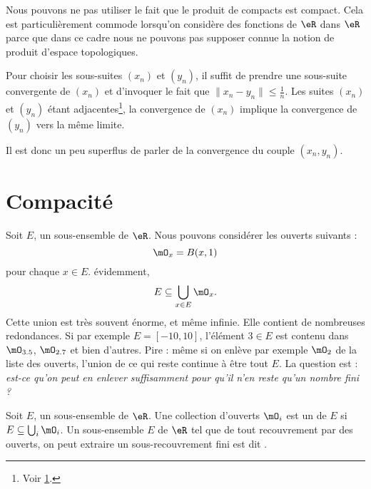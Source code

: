 \begin{remark}
    Nous pouvons ne pas utiliser le fait que le produit de compacts est compact. Cela est particulièrement commode lorsqu'on considère des fonctions de \( \eR\) dans \( \eR\) parce que dans ce cadre nous ne pouvons pas supposer connue la notion de produit d'espace topologiques.

    Pour choisir les sous-suites \( (x_n)\) et \( (y_n)\), il suffit de prendre une sous-suite convergente de \( (x_n)\) et d'invoquer le fait que \( \| x_n-y_n \|\leq \frac{1}{ n }\). Les suites \( (x_n)\) et \( (y_n)\) étant adjacentes\footnote{Voir \ref{}.}, la convergence de \( (x_n)\) implique la convergence de \( (y_n)\) vers la même limite.

    Il est donc un peu superflus de parler de la convergence du couple \( (x_n,y_n)\).
\end{remark}

\section{Compacité}

Soit $E$, un sous-ensemble de $\eR$. Nous pouvons considérer les ouverts suivants :
\begin{equation}
    \mO_x=B(x,1)
\end{equation}
pour chaque $x\in E$. évidemment,
\begin{equation}
    E\subseteq \bigcup_{x\in E}\mO_x.
\end{equation}
Cette union est très souvent énorme, et même infinie. Elle contient de nombreuses redondances. Si par exemple $E=[-10,10]$, l'élément $3\in E$ est contenu dans $\mO_{3.5}$, $\mO_{2.7}$ et bien d'autres. Pire : même si on enlève par exemple $\mO_2$ de la liste des ouverts, l'union de ce qui reste continue à être tout $E$. La question est : \emph{est-ce qu'on peut en enlever suffisamment pour qu'il n'en reste qu'un nombre fini ?}
\begin{definition}
Soit $E$, un sous-ensemble de $\eR$. Une collection d'ouverts $\mO_i$ est un  de $E$ si $E\subseteq \bigcup_{i}\mO_i$. Un sous-ensemble $E$ de $\eR$ tel que de tout recouvrement par des ouverts, on peut extraire un sous-recouvrement fini est dit .
\end{definition}

